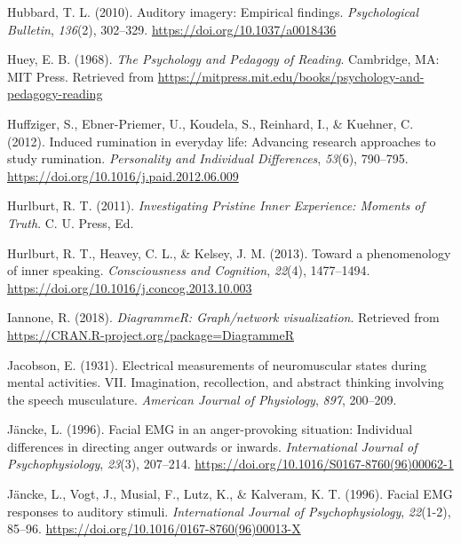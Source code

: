 \documentclass[a4paper,12pt,twoside,openright,oldfontcommands]{memoir}
\begin{document}
\leavevmode\hypertarget{ref-hubbard_auditory_2010}{}%
Hubbard, T. L. (2010). Auditory imagery: Empirical findings. \emph{Psychological Bulletin}, \emph{136}(2), 302--329. \url{https://doi.org/10.1037/a0018436}

\leavevmode\hypertarget{ref-huey_psychology_1968}{}%
Huey, E. B. (1968). \emph{The Psychology and Pedagogy of Reading}. Cambridge, MA: MIT Press. Retrieved from \url{https://mitpress.mit.edu/books/psychology-and-pedagogy-reading}

\leavevmode\hypertarget{ref-Huffziger2012}{}%
Huffziger, S., Ebner-Priemer, U., Koudela, S., Reinhard, I., \& Kuehner, C. (2012). Induced rumination in everyday life: Advancing research approaches to study rumination. \emph{Personality and Individual Differences}, \emph{53}(6), 790--795. \url{https://doi.org/10.1016/j.paid.2012.06.009}

\leavevmode\hypertarget{ref-Hurlburt2011}{}%
Hurlburt, R. T. (2011). \emph{Investigating Pristine Inner Experience: Moments of Truth}. C. U. Press, Ed.

\leavevmode\hypertarget{ref-Hurlburt2013}{}%
Hurlburt, R. T., Heavey, C. L., \& Kelsey, J. M. (2013). Toward a phenomenology of inner speaking. \emph{Consciousness and Cognition}, \emph{22}(4), 1477--1494. \url{https://doi.org/10.1016/j.concog.2013.10.003}

\leavevmode\hypertarget{ref-R-DiagrammeR}{}%
Iannone, R. (2018). \emph{DiagrammeR: Graph/network visualization}. Retrieved from \url{https://CRAN.R-project.org/package=DiagrammeR}

\leavevmode\hypertarget{ref-jacobson_electrical_1931}{}%
Jacobson, E. (1931). Electrical measurements of neuromuscular states during mental activities. VII. Imagination, recollection, and abstract thinking involving the speech musculature. \emph{American Journal of Physiology}, \emph{897}, 200--209.

\leavevmode\hypertarget{ref-Jancke1996a}{}%
Jäncke, L. (1996). Facial EMG in an anger-provoking situation: Individual differences in directing anger outwards or inwards. \emph{International Journal of Psychophysiology}, \emph{23}(3), 207--214. \url{https://doi.org/10.1016/S0167-8760(96)00062-1}

\leavevmode\hypertarget{ref-Jancke1996}{}%
Jäncke, L., Vogt, J., Musial, F., Lutz, K., \& Kalveram, K. T. (1996). Facial EMG responses to auditory stimuli. \emph{International Journal of Psychophysiology}, \emph{22}(1-2), 85--96. \url{https://doi.org/10.1016/0167-8760(96)00013-X}
\end{document}
